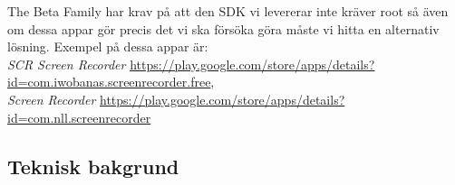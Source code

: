The Beta Family har krav på att den SDK vi levererar inte kräver root så även om dessa appar gör precis det vi ska försöka göra måste vi hitta en alternativ lösning. 
Exempel på dessa appar är: \\ \emph{SCR Screen Recorder} \url{https://play.google.com/store/apps/details?id=com.iwobanas.screenrecorder.free}, \\ \emph{Screen Recorder} \url{https://play.google.com/store/apps/details?id=com.nll.screenrecorder}
\subsection{Teknisk bakgrund}
